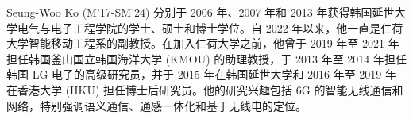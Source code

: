 \documentclass[journal]{IEEEtran}
\begin{document}
\begin{IEEEbiographynophoto}{Seung-Woo Ko}
(M'17-SM'24) 分别于 2006 年、2007 年和 2013 年获得韩国延世大学电气与电子工程学院的学士、硕士和博士学位。自 2022 年以来，他一直是仁荷大学智能移动工程系的副教授。在加入仁荷大学之前，他曾于 2019 年至 2021 年担任韩国釜山国立韩国海洋大学 (KMOU) 的助理教授，于 2013 年至 2014 年担任韩国 LG 电子的高级研究员，并于 2015 年在韩国延世大学和 2016 年至 2019 年在香港大学 (HKU) 担任博士后研究员。他的研究兴趣包括 6G 的智能无线通信和网络，特别强调语义通信、通感一体化和基于无线电的定位。
\end{IEEEbiographynophoto}
\end{document}
